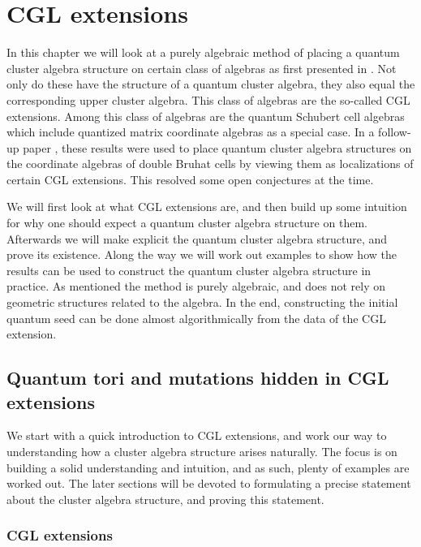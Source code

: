 \chapter{CGL extensions}\label{sec:cgl_extensions}

In this chapter we will look at a purely algebraic method of placing a quantum cluster
algebra structure on certain class of algebras as first presented in
\cite{GoodearlYakimov2017QCA}. Not only do these have the structure of a quantum
cluster algebra, they also equal the corresponding upper cluster algebra. This class of
algebras are the so-called CGL extensions. Among this class of algebras are the quantum
Schubert cell algebras which include quantized matrix coordinate algebras as a special
case. In a follow-up paper \cite{GoodearlYakimov2020BerensteinZelivinskyQCAC}, these
results were used to place quantum cluster algebra structures on the coordinate
algebras of double Bruhat cells by viewing them as localizations of certain CGL
extensions. This resolved some open conjectures at the time.

We will first look at what CGL extensions are, and then build up some intuition for why
one should expect a quantum cluster algebra structure on them. Afterwards we will make
explicit the quantum cluster algebra structure, and prove its existence. Along the way
we will work out examples to show how the results can be used to construct the quantum
cluster algebra structure in practice. As mentioned the method is purely algebraic, and
does not rely on geometric structures related to the algebra. In the end, constructing
the initial quantum seed can be done almost algorithmically from the data of the CGL
extension.

\section{Quantum tori and mutations hidden in CGL extensions}\label{sec:cgl_introduction}

We start with a quick introduction to CGL extensions, and work our way to understanding
how a cluster algebra structure arises naturally. The focus is on building a solid
understanding and intuition, and as such, plenty of examples are worked out. The later
sections will be devoted to formulating a precise statement about the cluster algebra
structure, and proving this statement.

\subsection{CGL extensions}

